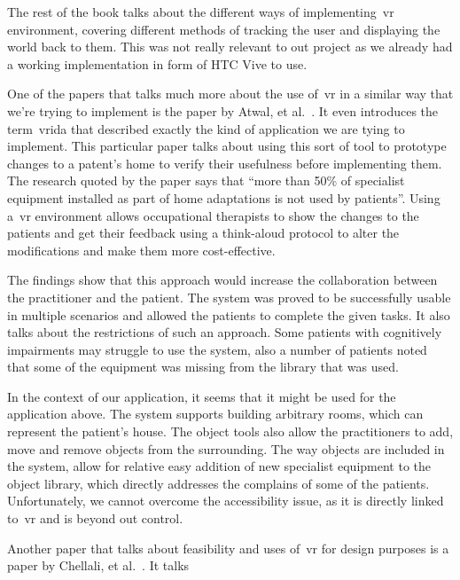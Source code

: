 The rest of the book talks about the different ways of implementing~\acrshort{vr} environment, covering different methods of tracking the user and displaying the world back to them. This was not really relevant to out project as we already had a working implementation in form of HTC Vive to use.

One of the papers that talks much more about the use of~\acrfull{vr} in a similar way that we're trying to implement is the paper by Atwal, et al.~\cite{atwal2014}. It even introduces the term~\acrfull{vrida} that described exactly the kind of application we are tying to implement. This particular paper talks about using this sort of tool to prototype changes to a patent's home to verify their usefulness before implementing them. The research quoted by the paper says that ``more than 50\% of specialist equipment installed as part of home adaptations is not used by patients''. Using a~\acrfull{vr} environment allows occupational therapists to show the changes to the patients and get their feedback using a think-aloud protocol to alter the modifications and make them more cost-effective.

The findings show that this approach would increase the collaboration between the practitioner and the patient. The system was proved to be successfully usable in multiple scenarios and allowed the patients to complete the given tasks. It also talks about the restrictions of such an approach. Some patients with cognitively impairments may struggle to use the system, also a number of patients noted that some of the equipment was missing from the library that was used.

In the context of our application, it seems that it might be used for the application above. The system supports building arbitrary rooms, which can represent the patient's house. The object tools also allow the practitioners to add, move and remove objects from the surrounding. The way objects are included in the system, allow for relative easy addition of new specialist equipment to the object library, which directly addresses the complains of some of the patients. Unfortunately, we cannot overcome the accessibility issue, as it is directly linked to~\acrfull{vr} and is beyond out control.

Another paper that talks about feasibility and uses of~\acrfull{vr} for design purposes is a paper by Chellali, et al.~\cite{chellali2013}. It talks 

% 